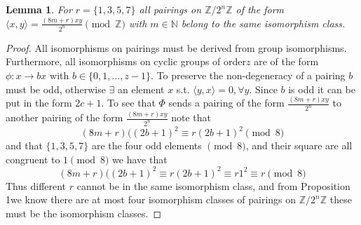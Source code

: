 \documentclass{amsart}
\newtheorem{lem}{Lemma}
\theoremstyle{definition}
\newcommand{\N}{\ensuremath{\mathbb{N}}}
\newcommand{\Z}{\ensuremath{\mathbb{Z}}}
\newcommand{\1}{\ensuremath{\mathds{1}}}
\begin{document}
 \begin{lem}
  For $r=\{1, 3, 5, 7\}$ all pairings on $\Z/2^{n}\Z$ of the form $\langle x, y\rangle=\frac{(8m+r)xy}{2^{n}}\pmod\Z$ with $m\in \N$ belong to the same isomorphism class.
 \end{lem}
 \begin{proof}
  All isomorphisms on pairings must be derived from group isomorphisms. Furthermore, all isomorphisms on cyclic groups of order$z$ are of the form $\phi:x\to bx$ with $b\in\{0, 1, \dots, z-1\}$. To preserve the non-degeneracy of a pairing $b$ must be odd, otherwise $\exists$ an element $x$ s.t. $\langle y, x\rangle=0, \forall y$. Since $b$ is odd it can be put in the form $2c+1$. To see that $\Phi$ sends a pairing of the form $\frac{(8m+r)xy}{2^{n}}$ to another pairing of the form $\frac{(8m+r)xy}{2^{n}}$ note that 
   \[
    (8m+r)((2b+1)^{2}\equiv r(2b+1)^{2}\pmod 8
   \]
  and that $\{1, 3, 5, 7\}$ are the four odd elements $\pmod 8$, and their square are all congruent to $1\pmod8$ we have that
   \[
    (8m+r)((2b+1)^{2}\equiv r(2b+1)^{2}\equiv r1^{2}\equiv r\pmod8
   \]
   Thus different $r$ cannot be in the same isomorphism class, and from Proposition 1we know there are at most four isomorphism classes of pairings on $\Z/2^{n}\Z$ these must be the isomorphism classes.
 \end{proof}
\end{document}
